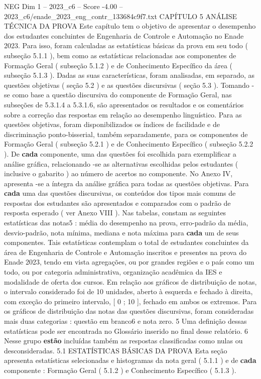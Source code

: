 \begin{textsample}{NEG Dim 1 – 2023\_c6 – Score -4.00 – 2023\_c6/enade\_2023\_eng\_contr\_133684c9f7.txt}  \label{ex:f1_neg_204}
CAPÍTULO 5 ANÁLISE TÉCNICA DA PROVA Este capítulo tem o objetivo de apresentar o desempenho dos estudantes concluintes de Engenharia de Controle e Automação no Enade 2023.
Para isso, foram calculadas as estatísticas básicas da prova em seu todo ( subseção 5.1.1 ), bem como as estatísticas relacionadas aos componentes de Formação Geral ( subseção 5.1.2 ) e de Conhecimento Específico da área ( subseção 5.1.3 ).
Dadas as suas características, foram analisadas, em separado, as questões objetivas ( seção 5.2 ) e as questões discursivas ( seção 5.3 ).
Tomando -se como base a questão discursiva do componente de Formação Geral, nas subseções de 5.3.1.4 a 5.3.1.6, são apresentados os resultados e os comentários sobre a correção das respostas em relação ao desempenho linguístico.
Para as questões objetivas, foram disponibilizados os índices de facilidade e de discriminação ponto-bisserial, também separadamente, para os componentes de Formação Geral ( subseção 5.2.1 ) e de Conhecimento Específico ( subseção 5.2.2 ).
De \textbf{cada} componente, uma das questões foi escolhida para exemplificar a análise gráfica, relacionando -se as alternativas escolhidas pelos estudantes ( inclusive o gabarito ) ao número de acertos no componente.
No Anexo IV, apresenta -se a íntegra da análise gráfica para todas as questões objetivas.
Para \textbf{cada} uma das questões discursivas, os conteúdos dos tipos mais comuns de respostas dos estudantes são apresentados e comparados com o padrão de resposta esperado ( ver Anexo VIII ).
Nas tabelas, constam as seguintes estatísticas das notas5 : média do desempenho na prova, erro-padrão da média, desvio-padrão, nota mínima, mediana e nota máxima para \textbf{cada} um de seus componentes.
Tais estatísticas contemplam o total de estudantes concluintes da área de Engenharia de Controle e Automação inscritos e presentes na prova do Enade 2023, tendo em vista agregações, ou por grandes regiões e o país como um todo, ou por categoria administrativa, organização acadêmica da IES e modalidade de oferta dos cursos.
Em relação aos gráficos de distribuição de notas, o intervalo considerado foi de 10 unidades, aberto à esquerda e fechado à direita, com exceção do primeiro intervalo, [ 0 ; 10 ], fechado em ambos os extremos.
Para os gráficos de distribuição das notas das questões discursivas, foram consideradas mais duas categorias : questão em branco6 e nota zero. 5 Uma definição dessas estatísticas pode ser encontrada no Glossário inserido no final desse relatório. 6 Nesse grupo \textbf{estão} incluídas também as respostas classificadas como nulas ou desconsideradas. 5.1 ESTATÍSTICAS BÁSICAS DA PROVA Esta seção apresenta estatísticas selecionadas e histogramas da nota geral ( 5.1.1 ) e de \textbf{cada} componente : Formação Geral ( 5.1.2 ) e Conhecimento Específico ( 5.1.3 ).

\end{textsample}
